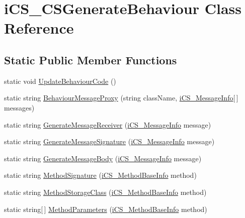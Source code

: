 \hypertarget{classi_c_s___c_s_generate_behaviour}{\section{i\+C\+S\+\_\+\+C\+S\+Generate\+Behaviour Class Reference}
\label{classi_c_s___c_s_generate_behaviour}
}
\subsection*{Static Public Member Functions}
\begin{DoxyCompactItemize}
\item 
static void \hyperlink{classi_c_s___c_s_generate_behaviour_a34a541176f0911e45d78c3828db9ab94}{Update\+Behaviour\+Code} ()
\item 
static string \hyperlink{classi_c_s___c_s_generate_behaviour_a04ffc4b24c0512b24b76b224fab4a788}{Behaviour\+Message\+Proxy} (string class\+Name, \hyperlink{classi_c_s___message_info}{i\+C\+S\+\_\+\+Message\+Info}\mbox{[}$\,$\mbox{]} messages)
\item 
static string \hyperlink{classi_c_s___c_s_generate_behaviour_a52bc61bea868905165e714d665dd1e7a}{Generate\+Message\+Receiver} (\hyperlink{classi_c_s___message_info}{i\+C\+S\+\_\+\+Message\+Info} message)
\item 
static string \hyperlink{classi_c_s___c_s_generate_behaviour_ae71f3df401d74205d9f45a4df0a22430}{Generate\+Message\+Signature} (\hyperlink{classi_c_s___message_info}{i\+C\+S\+\_\+\+Message\+Info} message)
\item 
static string \hyperlink{classi_c_s___c_s_generate_behaviour_adde7976263c0e797c31fa445ff06ea43}{Generate\+Message\+Body} (\hyperlink{classi_c_s___message_info}{i\+C\+S\+\_\+\+Message\+Info} message)
\item 
static string \hyperlink{classi_c_s___c_s_generate_behaviour_a3132d0125f39c37bdda06e17b172d57a}{Method\+Signature} (\hyperlink{classi_c_s___method_base_info}{i\+C\+S\+\_\+\+Method\+Base\+Info} method)
\item 
static string \hyperlink{classi_c_s___c_s_generate_behaviour_a74c568510fd968ecb46c1969e58feb1e}{Method\+Storage\+Class} (\hyperlink{classi_c_s___method_base_info}{i\+C\+S\+\_\+\+Method\+Base\+Info} method)
\item 
static string\mbox{[}$\,$\mbox{]} \hyperlink{classi_c_s___c_s_generate_behaviour_a2c5d39a0b755567e04b06db1eb6bc93e}{Method\+Parameters} (\hyperlink{classi_c_s___method_base_info}{i\+C\+S\+\_\+\+Method\+Base\+Info} method)

\end{DoxyCompactItemize}
